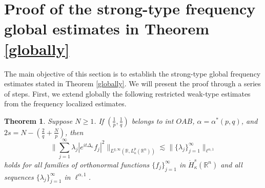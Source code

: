 \documentclass[a4paper,11pt, reqno]{amsart}
\numberwithin{equation}{section}
\theoremstyle{plain}
\newtheorem{theorem}{Theorem}[section]
\theoremstyle{definition}
\theoremstyle{remark}
\begin{document}
\section{Proof of the strong-type frequency global estimates in Theorem \ref{globally}}\label{sec6}
The main objective of this section is to establish the strong-type global frequency estimates stated in Theorem \ref{globally}. We will present the proof through a series of steps. First, we extend globally the following restricted weak-type estimates from the frequency localized estimates.
\begin{theorem}\label{restricted weak-type}
   Suppose $N\geq1$. If $(\frac{1}{p},\frac{1}{q})$ belongs to int $OAB$, $\alpha=\alpha^*(p,q)$, and $2s=N-\left(\frac{2}{q}+\frac{N}{p}\right)$, then
\begin{equation*}
	\bigg\|\sum_{j=1}^\infty \lambda_j|e^{it\Delta_\kappa}f_j|^2\bigg\|_{L^{q,\infty}(\mathbb{R}, L_\kappa^p(\mathbb{R}^n))}\lesssim \|\{\lambda_j\}^\infty_{j=1}\|_{\ell^{\alpha,1}} 
\end{equation*}	
  holds for all families of orthonormal functions $\{f_j\}_{j=1}^\infty$ in $\dot{H}_\kappa^s(\mathbb{R}^n)$ and all sequences $\{\lambda_j\}^\infty_{j=1}$ in $\ell^{\alpha,1}$. 
\end{theorem}
\end{document}
